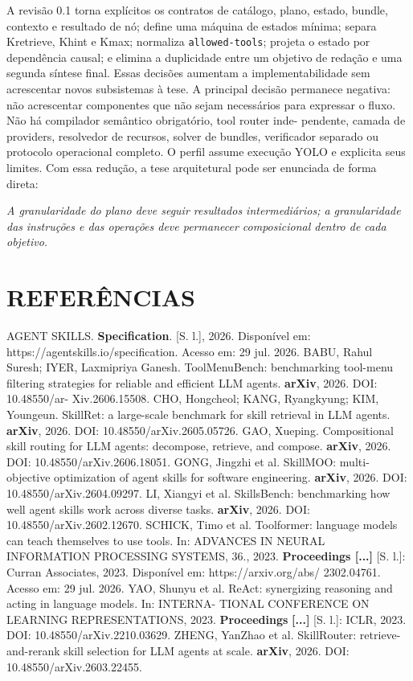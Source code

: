 \documentclass[12pt,a4paper]{article}
\begin{document}
A revisão 0.1 torna explícitos os contratos de catálogo, plano, estado, bundle, contexto e resultado de nó; define uma máquina de estados mínima; separa Kretrieve, Khint e Kmax; normaliza \texttt{allowed-tools}; projeta o estado por dependência causal; e elimina a duplicidade entre um objetivo de redação e uma segunda síntese final. Essas decisões aumentam a implementabilidade sem acrescentar novos subsistemas à tese. A principal decisão permanece negativa: não acrescentar componentes que não sejam necessários para expressar o fluxo. Não há compilador semântico obrigatório, tool router inde- pendente, camada de providers, resolvedor de recursos, solver de bundles, verificador separado ou protocolo operacional completo. O perfil assume execução YOLO e explicita seus limites. Com essa redução, a tese arquitetural pode ser enunciada de forma direta:



\textit{A granularidade do plano deve seguir resultados intermediários; a granularidade das} \textit{instruções e das operações deve permanecer composicional dentro de cada objetivo.}


\section*{REFERÊNCIAS}

AGENT SKILLS.\textbf{ Specification}. [S. l.], 2026. Disponível em: https://agentskills.io/specification. Acesso em: 29 jul. 2026. BABU, Rahul Suresh; IYER, Laxmipriya Ganesh. ToolMenuBench: benchmarking tool-menu filtering strategies for reliable and efficient LLM agents.\textbf{ arXiv}, 2026. DOI: 10.48550/ar- Xiv.2606.15508. CHO, Hongcheol; KANG, Ryangkyung; KIM, Youngeun. SkillRet: a large-scale benchmark for skill retrieval in LLM agents.\textbf{ arXiv}, 2026. DOI: 10.48550/arXiv.2605.05726. GAO, Xueping. Compositional skill routing for LLM agents: decompose, retrieve, and compose. \textbf{arXiv}, 2026. DOI: 10.48550/arXiv.2606.18051. GONG, Jingzhi et al. SkillMOO: multi-objective optimization of agent skills for software engineering.\textbf{ arXiv}, 2026. DOI: 10.48550/arXiv.2604.09297. LI, Xiangyi et al. SkillsBench: benchmarking how well agent skills work across diverse tasks. \textbf{arXiv}, 2026. DOI: 10.48550/arXiv.2602.12670. SCHICK, Timo et al. Toolformer: language models can teach themselves to use tools. In: ADVANCES IN NEURAL INFORMATION PROCESSING SYSTEMS, 36., 2023. \textbf{Proceedings [...]} [S. l.]: Curran Associates, 2023. Disponível em: https://arxiv.org/abs/ 2302.04761. Acesso em: 29 jul. 2026. YAO, Shunyu et al. ReAct: synergizing reasoning and acting in language models. In: INTERNA- TIONAL CONFERENCE ON LEARNING REPRESENTATIONS, 2023.\textbf{ Proceedings} \textbf{[...]} [S. l.]: ICLR, 2023. DOI: 10.48550/arXiv.2210.03629. ZHENG, YanZhao et al. SkillRouter: retrieve-and-rerank skill selection for LLM agents at scale. \textbf{arXiv}, 2026. DOI: 10.48550/arXiv.2603.22455.
\end{document}
